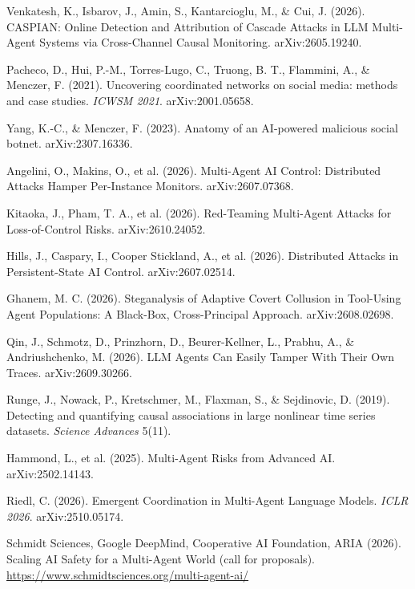 {\begin{enumerate}[label={[\arabic*]},leftmargin=2.2em,itemsep=1pt]
\item Venkatesh, K., Isbarov, J., Amin, S., Kantarcioglu, M., \& Cui, J. (2026). CASPIAN: Online Detection and Attribution of Cascade Attacks in LLM Multi-Agent Systems via Cross-Channel Causal Monitoring. arXiv:2605.19240.
\item Pacheco, D., Hui, P.-M., Torres-Lugo, C., Truong, B. T., Flammini, A., \& Menczer, F. (2021). Uncovering coordinated networks on social media: methods and case studies. \emph{ICWSM 2021}. arXiv:2001.05658.
\item Yang, K.-C., \& Menczer, F. (2023). Anatomy of an AI-powered malicious social botnet. arXiv:2307.16336.
\item Angelini, O., Makins, O., et al. (2026). Multi-Agent AI Control: Distributed Attacks Hamper Per-Instance Monitors. arXiv:2607.07368.
\item Kitaoka, J., Pham, T. A., et al. (2026). Red-Teaming Multi-Agent Attacks for Loss-of-Control Risks. arXiv:2610.24052.
\item Hills, J., Caspary, I., Cooper Stickland, A., et al. (2026). Distributed Attacks in Persistent-State AI Control. arXiv:2607.02514.
\item Ghanem, M. C. (2026). Steganalysis of Adaptive Covert Collusion in Tool-Using Agent Populations: A Black-Box, Cross-Principal Approach. arXiv:2608.02698.
\item Qin, J., Schmotz, D., Prinzhorn, D., Beurer-Kellner, L., Prabhu, A., \& Andriushchenko, M. (2026). LLM Agents Can Easily Tamper With Their Own Traces. arXiv:2609.30266.
\item Runge, J., Nowack, P., Kretschmer, M., Flaxman, S., \& Sejdinovic, D. (2019). Detecting and quantifying causal associations in large nonlinear time series datasets. \emph{Science Advances} 5(11).
\item Hammond, L., et al. (2025). Multi-Agent Risks from Advanced AI. arXiv:2502.14143.
\item Riedl, C. (2026). Emergent Coordination in Multi-Agent Language Models. \emph{ICLR 2026}. arXiv:2510.05174.
\item Schmidt Sciences, Google DeepMind, Cooperative AI Foundation, ARIA (2026). Scaling AI Safety for a Multi-Agent World (call for proposals). \url{https://www.schmidtsciences.org/multi-agent-ai/}
\end{enumerate}
}
